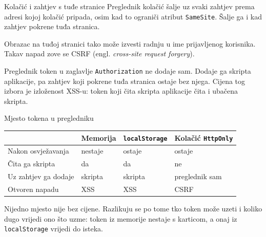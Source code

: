 \begin{frame}{Kolačić i zahtjev s tuđe stranice}
Preglednik kolačić šalje uz svaki zahtjev prema adresi kojoj kolačić pripada, osim kad to ograniči atribut \texttt{SameSite}. Šalje ga i kad zahtjev pokrene tuđa stranica.

\vspace{0.9em}
Obrazac na tuđoj stranici tako može izvesti radnju u ime prijavljenog korisnika. Takav napad zove se CSRF (engl. \emph{cross-site request forgery}).

\vspace{0.9em}
Preglednik token u zaglavlje \texttt{Authorization} ne dodaje sam. Dodaje ga skripta aplikacije, pa zahtjev koji pokrene tuđa stranica ostaje bez njega. Cijena tog izbora je izloženost XSS-u: token koji čita skripta aplikacije čita i ubačena skripta.
\end{frame}

\begin{frame}{Mjesto tokena u pregledniku}
\vspace{0.3em}
\begin{center}
{\small
\setlength{\tabcolsep}{6pt}
\renewcommand{\arraystretch}{1.3}
\begin{tabular}{@{}L{3.7cm}L{1.9cm}L{2.4cm}L{3.0cm}@{}}
  \toprule
   & \textbf{Memorija} & \textbf{\texttt{localStorage}} & \textbf{Kolačić \texttt{HttpOnly}} \\
  \midrule
  Nakon osvježavanja & nestaje & ostaje & ostaje \\
  Čita ga skripta & da & da & ne \\
  Uz zahtjev ga dodaje & skripta & skripta & preglednik sam \\
  Otvoren napadu & XSS & XSS & CSRF \\
  \bottomrule
\end{tabular}
}
\end{center}

\vspace{0.7em}
Nijedno mjesto nije bez cijene. Razlikuju se po tome tko token može uzeti i koliko dugo vrijedi ono što uzme: token iz memorije nestaje s karticom, a onaj iz \texttt{localStorage} vrijedi do isteka.
\end{frame}

